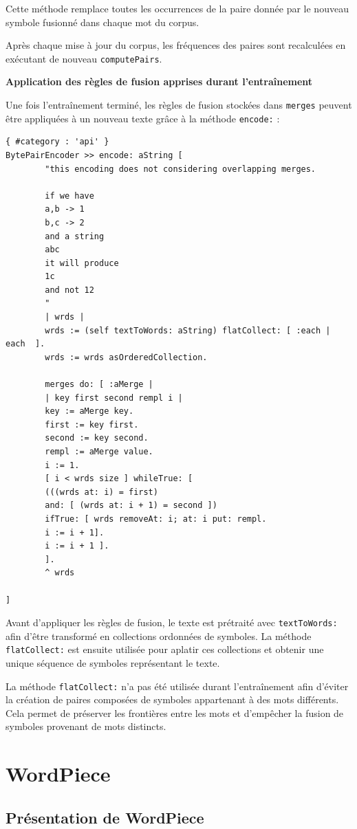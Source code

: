 \documentclass[12pt,a4paper]{report}
\begin{document}
Cette méthode remplace toutes les occurrences de la paire donnée par le nouveau symbole fusionné dans chaque mot du corpus.

Après chaque mise à jour du corpus, les fréquences des paires sont recalculées en exécutant de nouveau \texttt{computePairs}.

\textbf{Application des règles de fusion apprises durant l’entraînement}

Une fois l’entraînement terminé, les règles de fusion stockées dans \texttt{merges} peuvent être appliquées à un nouveau texte grâce à la méthode \texttt{encode:} :

\begin{verbatim}
{ #category : 'api' }
BytePairEncoder >> encode: aString [
		"this encoding does not considering overlapping merges. 
		
		if we have 
		a,b -> 1
		b,c -> 2	
		and a string
		abc 
		it will produce 
		1c
		and not 12
		"
		| wrds |
		wrds := (self textToWords: aString) flatCollect: [ :each | each  ].
		wrds := wrds asOrderedCollection.
		
		merges do: [ :aMerge |
		| key first second rempl i |
		key := aMerge key.
		first := key first.
		second := key second.
		rempl := aMerge value. 
		i := 1.
		[ i < wrds size ] whileTrue: [  
		(((wrds at: i) = first) 
		and: [ (wrds at: i + 1) = second ])
		ifTrue: [ wrds removeAt: i; at: i put: rempl.
		i := i + 1].
		i := i + 1 ].
		].
		^ wrds
		
]
\end{verbatim}

Avant d’appliquer les règles de fusion, le texte est prétraité avec \texttt{textToWords:} afin d’être transformé en collections ordonnées de symboles. La méthode \texttt{flatCollect:} est ensuite utilisée pour aplatir ces collections et obtenir une unique séquence de symboles représentant le texte.

La méthode \texttt{flatCollect:} n’a pas été utilisée durant l’entraînement afin d’éviter la création de paires composées de symboles appartenant à des mots différents. Cela permet de préserver les frontières entre les mots et d’empêcher la fusion de symboles provenant de mots distincts.
	
	\chapter{WordPiece}
	
	\section{Présentation de WordPiece}
	
\end{document}
